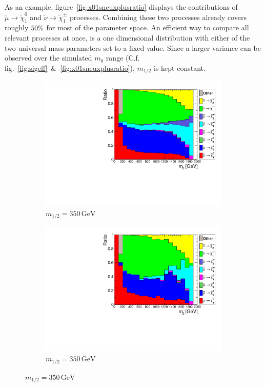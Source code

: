 \noindent As an example, figure~\ref{fig:x01sneuxplusratio} displays the contributions of $\tilde{\mu} \rightarrow \tilde{\chi}^0_1$ and $\tilde{\nu} \rightarrow \tilde{\chi}^\pm_1$ processes. Combining these two processes already covers roughly $50\pct$ for most of the parameter space. An efficient way to compare all relevant processes at once, is a one dimensional distribution with either of the two universal mass parameters set to a fixed value. Since a larger variance can be observed over the simulated $m_0$ range (C.f. fig.~\ref{fig:sigeff}~\&~\ref{fig:x01sneuxplusratio}), $m_{1/2}$ is kept constant.

\begin{figure}[ht!]
  \centering
  \begin{subfigure}[b]{0.495\textwidth}
    \centering
    \includegraphics[width=\textwidth]{plots/hCrossRatio350.pdf}
    \caption{$m_{1/2} = 350\,\text{GeV}$\label{fig:crossratio350}}
  \end{subfigure}
  \begin{subfigure}[b]{0.495\textwidth}
    \centering
    \includegraphics[width=\textwidth]{plots/hCutCrossRatio350.pdf}
    \caption{$m_{1/2} = 350\,\text{GeV}$\label{fig:cutcrossratio350}}
  \end{subfigure}


\end{figure}
